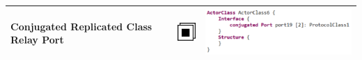 \begin{table}
\begin{longtable}{|b{2.5cm}|c|b{5.5cm}|}
 \raggedright Conjugated Replicated Class Relay Port & 
\includegraphics[scale=0.7]{images/040-ConjugatedReplicatedClassRelayPort.png} & 
\includegraphics[scale=0.7]{images/040-ConjugatedReplicatedClassRelayPortTextual.png} \\ \hline
\end{longtable}
\end{table}

